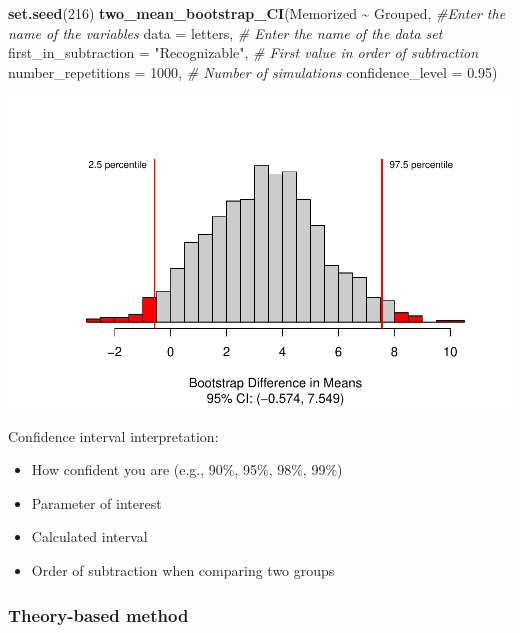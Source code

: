 \documentclass[
]{report}
\newenvironment{Shaded}{\begin{snugshade}}{\end{snugshade}}
\newcommand{\AttributeTok}[1]{\textcolor[rgb]{0.13,0.29,0.53}{#1}}
\newcommand{\CommentTok}[1]{\textcolor[rgb]{0.56,0.35,0.01}{\textit{#1}}}
\newcommand{\DecValTok}[1]{\textcolor[rgb]{0.00,0.00,0.81}{#1}}
\newcommand{\FloatTok}[1]{\textcolor[rgb]{0.00,0.00,0.81}{#1}}
\newcommand{\FunctionTok}[1]{\textcolor[rgb]{0.13,0.29,0.53}{\textbf{#1}}}
\newcommand{\NormalTok}[1]{#1}
\newcommand{\SpecialCharTok}[1]{\textcolor[rgb]{0.81,0.36,0.00}{\textbf{#1}}}
\newcommand{\StringTok}[1]{\textcolor[rgb]{0.31,0.60,0.02}{#1}}
\begin{document}
\begin{Shaded}
\begin{Highlighting}[]
\FunctionTok{set.seed}\NormalTok{(}\DecValTok{216}\NormalTok{)}
\FunctionTok{two\_mean\_bootstrap\_CI}\NormalTok{(Memorized }\SpecialCharTok{\textasciitilde{}}\NormalTok{ Grouped, }\CommentTok{\#Enter the name of the variables}
                      \AttributeTok{data =}\NormalTok{ letters,  }\CommentTok{\# Enter the name of the data set}
                      \AttributeTok{first\_in\_subtraction =} \StringTok{"Recognizable"}\NormalTok{, }\CommentTok{\# First value in order of subtraction}
                      \AttributeTok{number\_repetitions =} \DecValTok{1000}\NormalTok{,  }\CommentTok{\# Number of simulations}
                      \AttributeTok{confidence\_level =} \FloatTok{0.95}\NormalTok{)}
\end{Highlighting}
\end{Shaded}

\begin{center}\includegraphics[width=0.7\linewidth]{12-LN012-1ofeach_files/figure-latex/unnamed-chunk-5-1} \end{center}

Confidence interval interpretation:

\begin{itemize}
\item
  How confident you are (e.g., 90\%, 95\%, 98\%, 99\%)
\item
  Parameter of interest
\item
  Calculated interval
\item
  Order of subtraction when comparing two groups
\end{itemize}

\vspace{0.8in}

\hypertarget{theory-based-method-4}{%
\subsubsection*{Theory-based method}\label{theory-based-method-4}}
\end{document}
